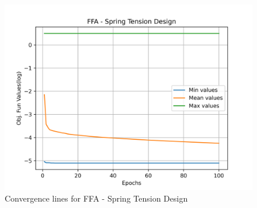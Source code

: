 \begin{figure}[H]
        \centering
        \caption{Convergence lines for FFA - Spring Tension Design}
        \label{fig:spring_problem_solve_ffa}
        \includegraphics[scale=0.5]{images/spring_problem_solve_ffa.png}
        \end{figure}
        